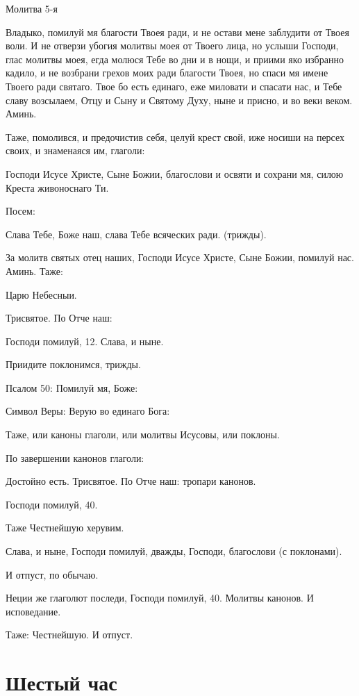 Молитва 5-я

Владыко, помилуй мя благости Твоея ради, и не остави мене заблудити от Твоея воли. И не отверзи убогия молитвы моея от Твоего лица, но услыши Господи, глас молитвы моея, егда молюся Тебе во дни и в нощи, и приими яко избранно кадило, и не возбрани грехов моих ради благости Твоея, но спаси мя имене Твоего ради святаго. Твое бо есть единаго, еже миловати и спасати нас, и Тебе славу возсылаем, Отцу и Сыну и Святому Духу, ныне и присно, и во веки веком. Аминь.


Таже, помолився, и предочистив себя, целуй крест свой, иже носиши на персех своих, и знаменаяся им, глаголи:

Господи Исусе Христе, Сыне Божии, благослови и освяти и сохрани мя, силою Креста живоноснаго Ти.

Посем:

Слава Тебе, Боже наш, слава Тебе всяческих ради. (трижды).

За молитв святых отец наших, Господи Исусе Христе, Сыне Божии, помилуй нас. Аминь. Таже:

Царю Небесныи.

Трисвятое. По Отче наш:

Господи помилуй, 12. Слава, и ныне.

Приидите поклонимся, трижды.

Псалом 50: Помилуй мя, Боже:

Символ Веры: Верую во единаго Бога:

Таже, или каноны глаголи, или молитвы Исусовы, или поклоны.

По завершении канонов глаголи:

Достойно есть. Трисвятое. По Отче наш: тропари канонов.

Господи помилуй, 40.

Таже Честнейшую херувим.

Слава, и ныне, Господи помилуй, дважды, Господи, благослови (с поклонами).

И отпуст, по обычаю.

Неции же глаголют последи, Господи помилуй, 40. Молитвы канонов. И исповедание.

Таже: Честнейшую. И отпуст.
\mychapterending


 

\section{Шестый час}
 


